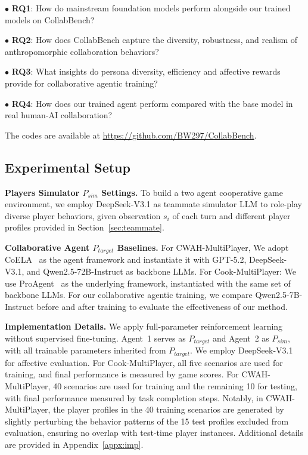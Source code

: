 \documentclass{article}
\theoremstyle{plain}
\theoremstyle{definition}
\theoremstyle{remark}
\begin{document}
$\bullet$ \textbf{RQ1}: How do mainstream foundation models perform alongside our trained models on CollabBench?

$\bullet$ \textbf{RQ2}: How does CollabBench capture the diversity, robustness, and realism of anthropomorphic collaboration behaviors?

$\bullet$ \textbf{RQ3}: What insights do persona diversity, efficiency and affective rewards provide for collaborative agentic training?

$\bullet$ \textbf{RQ4}: How does our trained agent perform compared with the base model in real human-AI collaboration?

The codes are available at \url{https://github.com/BW297/CollabBench}.

\subsection{Experimental Setup}

\textbf{Players Simulator $P_{sim}$ Settings.} To build a two agent cooperative game environment, we employ 
DeepSeek-V3.1 as teammate simulator LLM to role-play diverse player behaviors, given observation $s_i$ of each turn and different player profiles provided in Section~\ref{sec:teammate}.

\textbf{Collaborative Agent $P_{target}$ Baselines.} For CWAH-MultiPlayer, We adopt CoELA~\cite{ZhangDSZDTSG24} as the agent framework and instantiate it with GPT-5.2, DeepSeek-V3.1, and Qwen2.5-72B-Instruct as backbone LLMs. For Cook-MultiPlayer: We use ProAgent~\cite{ZhangYHWLSZZLZC24} as the underlying framework, instantiated with the same set of backbone LLMs. For our collaborative agentic training, we compare Qwen2.5-7B-Instruct before and after training to evaluate the effectiveness of our method.









\textbf{Implementation Details.} We apply full-parameter reinforcement learning without supervised fine-tuning. Agent~1 serves as $P_{target}$ and Agent~2 as $P_{sim}$, with all trainable parameters inherited from $P_{target}$. We employ DeepSeek-V3.1 for affective evaluation. For Cook-MultiPlayer, all five scenarios are used for training, and final performance is measured by game scores. For CWAH-MultiPlayer, 40 scenarios are used for training and the remaining 10 for testing, with final performance measured by task completion steps. Notably, in CWAH-MultiPlayer, the player profiles in the 40 training scenarios are generated by slightly perturbing the behavior patterns of the 15 test profiles excluded from evaluation, ensuring no overlap with test-time player instances. Additional details are provided in Appendix~\ref{appx:imp}.
\end{document}
